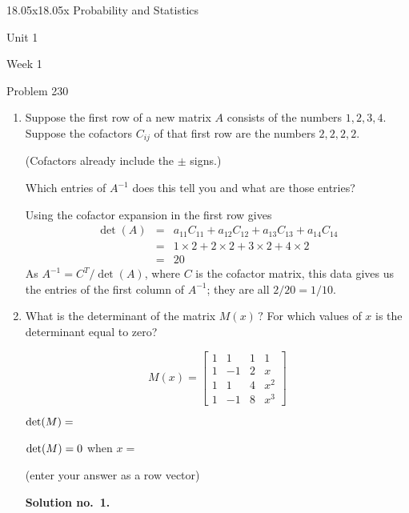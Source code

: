 \begin{edXcourse}{18.05x}{18.05x Probability and Statistics}
\begin{edXchapter}{Unit 1}
\begin{edXsection}{Week 1}
\begin{edXsequential}
\begin{edXproblem}{Problem 2}{30}
\begin{enumerate}
\item Suppose the first row of a new matrix $A$ consists of the numbers
$1,2,3,4$. Suppose the cofactors $C_{ij}$ of that first row are the
numbers $2,2,2,2$.

(Cofactors already include 
the $\pm$ signs.) 


\vspace{2ex}
Which entries of $A^{-1}$ does this tell you and what are those entries?


\begin{sol}
Using the cofactor expansion in the first row gives
\begin{eqnarray*}
\det(A) & = & a_{11} C_{11} + a_{12}C_{12} + a_{13}C_{13} + a_{14}C_{14} \\
& = & 1 \times 2 + 2 \times 2 + 3 \times 2 + 4 \times 2 \\
& = & 20
\end{eqnarray*}
As $A^{-1} = C^T /\det(A)$, where $C$ is the cofactor matrix, this data gives us the entries of the first column of $A^{-1}$; they are all $2 / 20 = 1/10$. 
\end{sol}

\newpage
\item What is the determinant of the matrix $M(x) \, ?$ For which values
of $x$ is the determinant equal to zero?

\begin{center}


\[
M(x) = 
  \left [ \begin{array}{crcl}
1 & 1 & 1 & 1\\
1 & -1 & 2 & x\\
1 & 1 & 4 & x^{2}\\
1 & -1 & 8 & x^{3}

\end{array} \right ]
\]


\end{center}

${\rm det}(M) = $  %

${\rm det}(M) = 0$ when $x=$  %

(enter your answer as a row vector)	%

\begin{sol}

\textbf{Solution no.~1.}


\end{sol}
\end{enumerate}
\end{edXproblem}
\end{edXsequential}
\end{edXsection}
\end{edXchapter}
\end{edXcourse}
